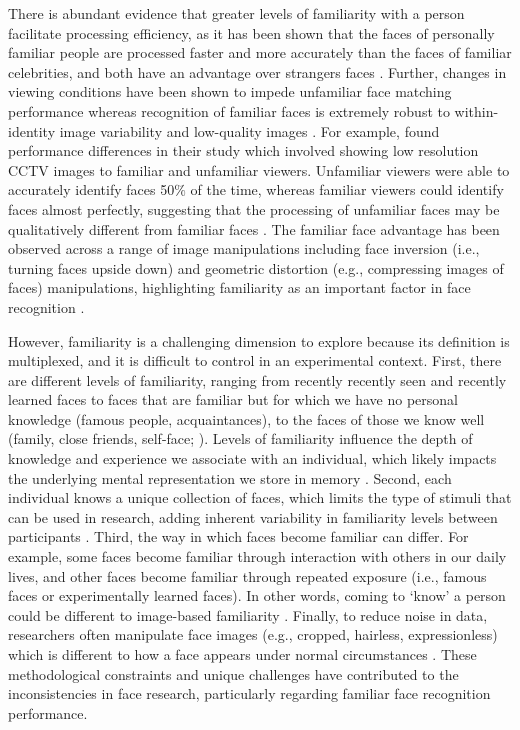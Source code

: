 \documentclass[
  10pt,
  letterpaper,
]{article}
\begin{document}
There is abundant evidence that greater levels of familiarity with a
person facilitate processing efficiency, as it has been shown that the
faces of personally familiar people are processed faster and more
accurately than the faces of familiar celebrities, and both have an
advantage over strangers faces
\citep{bortolon2017a, burton2015a, tong1999a, young2017a}. Further,
changes in viewing conditions have been shown to impede unfamiliar face
matching performance whereas recognition of familiar faces is extremely
robust to within-identity image variability and low-quality images
\citep{burton2013a, jenkins2011a, liccione2014a}. For example,
\citet{burton1999a} found performance differences in their study which
involved showing low resolution CCTV images to familiar and unfamiliar
viewers. Unfamiliar viewers were able to accurately identify faces
50\(\%\) of the time, whereas familiar viewers could identify faces
almost perfectly, suggesting that the processing of unfamiliar faces may
be qualitatively different from familiar faces \citep{burton1999a}. The
familiar face advantage has been observed across a range of image
manipulations including face inversion (i.e., turning faces upside down)
and geometric distortion (e.g., compressing images of faces)
manipulations, highlighting familiarity as an important factor in face
recognition
\citep{allen-davidian2021a, kramer2018a, yang2014a, rossion_picture-plane_2008, hole_effects_2002}.

However, familiarity is a challenging dimension to explore because its
definition is multiplexed, and it is difficult to control in an
experimental context. First, there are different levels of familiarity,
ranging from recently recently seen and recently learned faces to faces
that are familiar but for which we have no personal knowledge (famous
people, acquaintances), to the faces of those we know well (family,
close friends, self-face; \citet{ramon2011a}). Levels of familiarity
influence the depth of knowledge and experience we associate with an
individual, which likely impacts the underlying mental representation we
store in memory \citep{ramon2017a}. Second, each individual knows a
unique collection of faces, which limits the type of stimuli that can be
used in research, adding inherent variability in familiarity levels
between participants \citep{ramon2017a}. Third, the way in which faces
become familiar can differ. For example, some faces become familiar
through interaction with others in our daily lives, and other faces
become familiar through repeated exposure (i.e., famous faces or
experimentally learned faces). In other words, coming to `know' a person
could be different to image-based familiarity \citep{kramer2018a}.
Finally, to reduce noise in data, researchers often manipulate face
images (e.g., cropped, hairless, expressionless) which is different to
how a face appears under normal circumstances
\citep{burton2011a, long_database_2023}. These methodological
constraints and unique challenges have contributed to the
inconsistencies in face research, particularly regarding familiar face
recognition performance.
\end{document}
